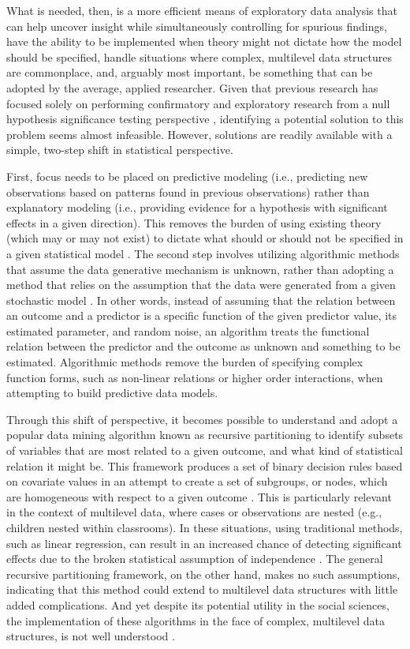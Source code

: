 What is needed, then, is a more efficient means of exploratory data analysis that can help uncover insight while simultaneously controlling for spurious findings, have the ability to be implemented when theory might not dictate how the model should be specified, handle situations where complex, multilevel data structures are commonplace, and, arguably most important, be something that can be adopted by the average, applied researcher. Given that previous research has focused solely on performing confirmatory and exploratory research from a null hypothesis significance testing perspective \cite{berk2008statistical, finkelinpress}, identifying a potential solution to this problem seems almost infeasible. However, solutions are readily available with a simple, two-step shift in statistical perspective. 

First, focus needs to be placed on predictive modeling (i.e., predicting new observations based on patterns found in previous observations) rather than explanatory modeling (i.e., providing evidence for a hypothesis with significant effects in a given direction). This removes the burden of using existing theory (which may or may not exist) to dictate what should or should not be specified in a given statistical model \cite{shmueli2010explain}. The second step involves utilizing algorithmic methods that assume the data generative mechanism is unknown, rather than adopting a method that relies on the assumption that the data were generated from a given stochastic model \cite{breiman2001statistical}. In other words, instead of assuming that the relation between an outcome and a predictor is a specific function of the given predictor value, its estimated parameter, and random noise, an algorithm treats the functional relation between the predictor and the outcome as unknown and something to be estimated. Algorithmic methods remove the burden of specifying complex function forms, such as non-linear relations or higher order interactions, when attempting to build predictive data models.


Through this shift of perspective, it becomes possible to understand and adopt a popular data mining algorithm known as recursive partitioning to identify subsets of variables that are most related to a given outcome, and what kind of statistical relation it might be. This framework produces a set of binary decision rules based on covariate values in an attempt to create a set of subgroups, or nodes, which are homogeneous with respect to a given outcome \cite{mcardle2013}. This is particularly relevant in the context of multilevel data, where cases or observations are nested (e.g., children nested within classrooms). In these situations, using traditional methods, such as linear regression, can result in an increased chance of detecting significant effects due to the broken statistical assumption of independence \cite{peugh2010practical}. The general recursive partitioning framework, on the other hand, makes no such assumptions, indicating that this method could extend to multilevel data structures with little added complications. And yet despite its potential utility in the social sciences, the implementation of these algorithms in the face of complex, multilevel data structures, is not well understood \cite{mcardle2013}.


